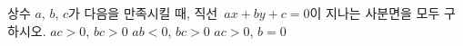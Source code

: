 상수 $a$, $b$, $c$가 다음을 만족시킬 때, 직선~$ax+by+c=0$이 지나는 사분면을 모두 구하시오.
 $ac>0$, $bc>0$
 $ab<0$, $bc>0$
 $ac>0$, $b=0$
